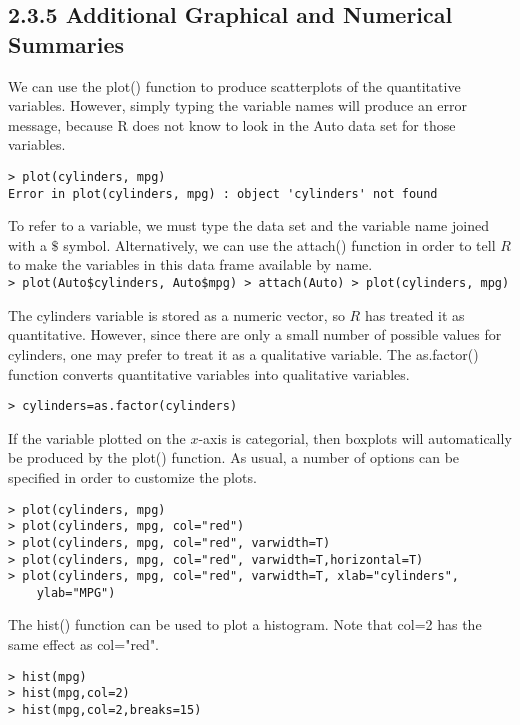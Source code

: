 \documentclass[10pt]{article}
\begin{document}
\subsection*{2.3.5 Additional Graphical and Numerical Summaries}
We can use the plot() function to produce scatterplots of the quantitative variables. However, simply typing the variable names will produce an error message, because R does not know to look in the Auto data set for those variables.


\begin{verbatim}
> plot(cylinders, mpg)
Error in plot(cylinders, mpg) : object 'cylinders' not found
\end{verbatim}

To refer to a variable, we must type the data set and the variable name joined with a $\$$ symbol. Alternatively, we can use the attach() function in order to tell $R$ to make the variables in this data frame available by name.\\
\texttt{> plot(Auto\$cylinders, Auto\$mpg) > attach(Auto) > plot(cylinders, mpg)}

The cylinders variable is stored as a numeric vector, so $R$ has treated it as quantitative. However, since there are only a small number of possible values for cylinders, one may prefer to treat it as a qualitative variable. The as.factor() function converts quantitative variables into qualitative variables.

\begin{verbatim}
> cylinders=as.factor(cylinders)
\end{verbatim}

If the variable plotted on the $x$-axis is categorial, then boxplots will automatically be produced by the plot() function. As usual, a number of options can be specified in order to customize the plots.

\begin{verbatim}
> plot(cylinders, mpg)
> plot(cylinders, mpg, col="red")
> plot(cylinders, mpg, col="red", varwidth=T)
> plot(cylinders, mpg, col="red", varwidth=T,horizontal=T)
> plot(cylinders, mpg, col="red", varwidth=T, xlab="cylinders",
    ylab="MPG")
\end{verbatim}

The hist() function can be used to plot a histogram. Note that col=2 has the same effect as col="red".

\begin{verbatim}
> hist(mpg)
> hist(mpg,col=2)
> hist(mpg,col=2,breaks=15)
\end{verbatim}
\end{document}
